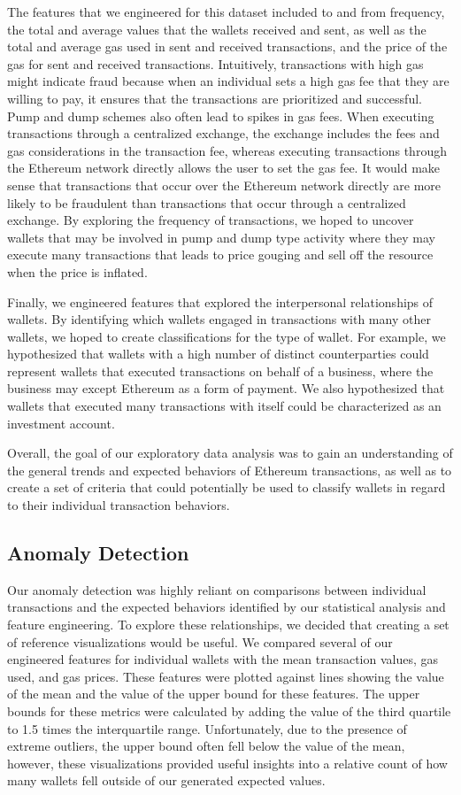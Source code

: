 \documentclass[sigconf]{acmart}
\begin{document}
The features that we engineered for this dataset included to and from frequency, the total and average values that the wallets received and sent, as well as the total and average gas used in sent and received transactions, and the price of the gas for sent and received transactions. Intuitively, transactions with high gas might indicate fraud because when an individual sets a high gas fee that they are willing to pay, it ensures that the transactions are prioritized and successful. Pump and dump schemes also often lead to spikes in gas fees. When executing transactions through a centralized exchange, the exchange includes the fees and gas considerations in the transaction fee, whereas executing transactions through the Ethereum network directly allows the user to set the gas fee. It would make sense that transactions that occur over the Ethereum network directly are more likely to be fraudulent than transactions that occur through a centralized exchange. By exploring the frequency of transactions, we hoped to uncover wallets that may be involved in pump and dump type activity where they may execute many transactions that leads to price gouging and sell off the resource when the price is inflated. 

Finally, we engineered features that explored the interpersonal relationships of wallets. By identifying which wallets engaged in transactions with many other wallets, we hoped to create classifications for the type of wallet. For example, we hypothesized that wallets with a high number of distinct counterparties could represent wallets that executed transactions on behalf of a business, where the business may except Ethereum as a form of payment. We also hypothesized that wallets that executed many transactions with itself could be characterized as an investment account.  

Overall, the goal of our exploratory data analysis was to gain an understanding of the general trends and expected behaviors of Ethereum transactions, as well as to create a set of criteria that could potentially be used to classify wallets in regard to their individual transaction behaviors. 

\subsection{Anomaly Detection}
Our anomaly detection was highly reliant on comparisons between individual transactions and the expected behaviors identified by our statistical analysis and feature engineering. To explore these relationships, we decided that creating a set of reference visualizations would be useful. We compared several of our engineered features for individual wallets with the mean transaction values, gas used, and gas prices. These features were plotted against lines showing the value of the mean and the value of the upper bound for these features. The upper bounds for these metrics were calculated by adding the value of the third quartile to 1.5 times the interquartile range. Unfortunately, due to the presence of extreme outliers, the upper bound often fell below the value of the mean, however, these visualizations provided useful insights into a relative count of how many wallets fell outside of our generated expected values.  
\end{document}
